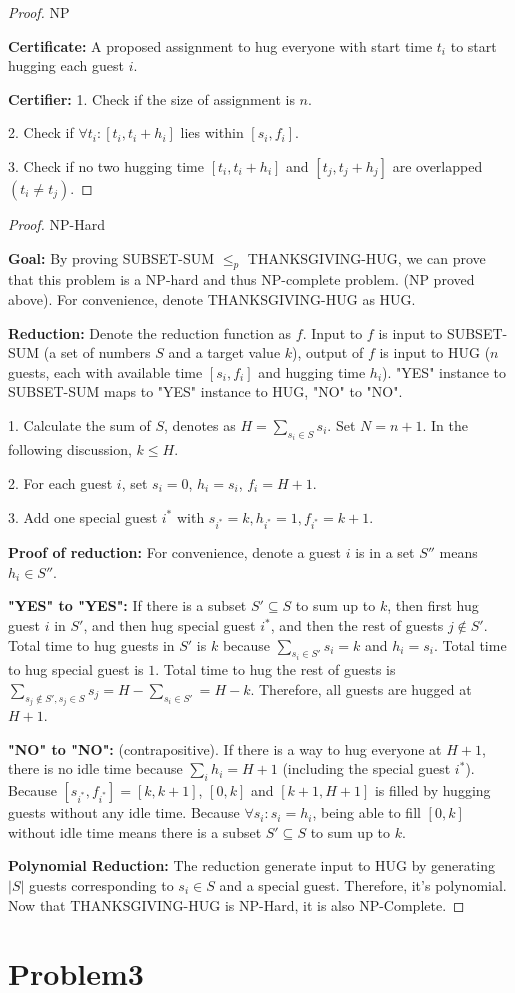 \documentclass[openany]{article}
\begin{document}
\begin{proof}{NP}

\textbf{Certificate:} A proposed assignment to hug everyone with start time $t_i$ to start hugging each guest $i$.

\textbf{Certifier:} 1. Check if the size of assignment is $n$.

2. Check if $\forall t_i: [t_i, t_i+h_i]$ lies within $[s_i, f_i]$.

3. Check if no two hugging time $[t_i, t_i+h_i]$ and $[t_j, t_j+h_j]$ are overlapped $(t_i \neq t_j)$.

\end{proof}

\begin{proof}{NP-Hard}

\textbf{Goal:} By proving SUBSET-SUM $\leqslant_p$ THANKSGIVING-HUG, we can prove that this problem is a NP-hard and thus NP-complete problem. (NP proved above). For convenience, denote THANKSGIVING-HUG as HUG.

\textbf{Reduction:} Denote the reduction function as $f$. Input to $f$ is input to SUBSET-SUM (a set of numbers $S$ and a target value $k$), output of $f$ is input to HUG ($n$ guests, each with available time $[s_i, f_i]$ and hugging time $h_i$). "YES" instance to SUBSET-SUM maps to "YES" instance to HUG, "NO" to "NO". 

1. Calculate the sum of $S$, denotes as $H = \sum_{s_i\in S}s_i$. Set $N = n+1$. In the following discussion, $k \leqslant H$.

2. For each guest $i$, set $s_i = 0$, $h_i=s_i$, $f_i = H+1$. 

3. Add one special guest $i^*$ with $s_{i^*} = k, h_{i^*} = 1, f_{i^*} = k+1$.


\textbf{Proof of reduction:} For convenience, denote a guest $i$ is in a set $S''$ means $h_i\in S''$.

\textbf{"YES" to "YES":} If there is a subset $S' \subseteq S$ to sum up to $k$, then first hug guest $i$ in $S'$, and then hug special guest $i^*$, and then the rest of guests $j  \not\in S'$. Total time to hug guests in $S'$ is $k$ because $\sum_{s_i\in S'}s_i = k $ and $h_i = s_i$. Total time to hug special guest is $1$. Total time to hug the rest of guests is $\sum_{s_j\notin S', s_j\in S} s_j = H-\sum_{s_i\in S'} = H-k$. Therefore, all guests are hugged at $H+1$.


\textbf{"NO" to "NO":} (contrapositive). If there is a way to hug everyone at $H+1$, there is no idle time because $\sum_i h_i = H+1$ (including the special guest $i^*$). Because $[s_{i^*},f_{i^*}] = [k, k+1]$, $[0,k]$ and $[k+1, H+1]$ is filled by hugging guests without any idle time. Because $\forall s_i: s_i=h_i$, being able to fill $[0,k]$ without idle time means there is a subset $S' \subseteq S$ to sum up to $k$.

\textbf{Polynomial Reduction:} The reduction generate input to HUG by generating $|S|$ guests corresponding to $s_i\in S$ and a special guest. Therefore, it's polynomial. Now that THANKSGIVING-HUG is NP-Hard, it is also NP-Complete.
\end{proof}

\section*{Problem3}
\end{document}
